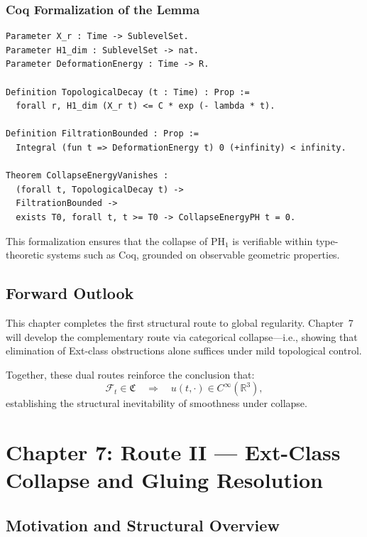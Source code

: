 \documentclass[11pt]{article}
\begin{document}
\subsubsection*{Coq Formalization of the Lemma}

\begin{lstlisting}[language=Coq, caption={Coq formalization of Collapse Energy Decay Lemma}]
Parameter X_r : Time -> SublevelSet.
Parameter H1_dim : SublevelSet -> nat.
Parameter DeformationEnergy : Time -> R.

Definition TopologicalDecay (t : Time) : Prop :=
  forall r, H1_dim (X_r t) <= C * exp (- lambda * t).

Definition FiltrationBounded : Prop :=
  Integral (fun t => DeformationEnergy t) 0 (+infinity) < infinity.

Theorem CollapseEnergyVanishes :
  (forall t, TopologicalDecay t) ->
  FiltrationBounded ->
  exists T0, forall t, t >= T0 -> CollapseEnergyPH t = 0.
\end{lstlisting}


This formalization ensures that the collapse of \( \mathrm{PH}_1 \) is verifiable within type-theoretic systems such as Coq, grounded on observable geometric properties.





\subsection{Forward Outlook}

This chapter completes the first structural route to global regularity. Chapter~7 will develop the complementary route via categorical collapse—i.e., showing that elimination of Ext-class obstructions alone suffices under mild topological control.

Together, these dual routes reinforce the conclusion that:
\[
\mathcal{F}_t \in \mathfrak{C} \quad \Longrightarrow \quad u(t, \cdot) \in C^\infty(\mathbb{R}^3),
\]
establishing the structural inevitability of smoothness under collapse.



\section{Chapter 7: Route II — Ext-Class Collapse and Gluing Resolution}
\label{sec:ext-collapse-route}

\subsection{Motivation and Structural Overview}
\end{document}
